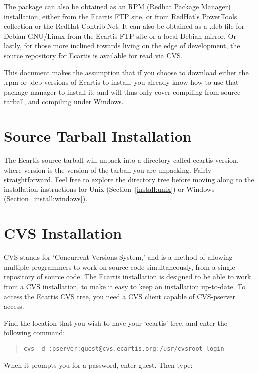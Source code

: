 \documentclass{book}
\begin{document}
The package can also be obtained as an RPM (Redhat Package Manager)
installation, either from the Ecartis FTP site, or from RedHat's PowerTools
collection or the RedHat Contrib|Net.  It can also be obtained as a .deb file
for Debian GNU/Linux from the Ecartis FTP site or a local Debian mirror.  Or
lastly, for those more inclined towards living on the edge of development, the
source repository for Ecartis is available for read via CVS.
   
This document makes the assumption that if you choose to download either the
.rpm or .deb versions of Ecartis to install, you already know how to use that
package manager to install it, and will thus only cover compiling from source
tarball, and compiling under Windows.

\section{Source Tarball Installation}
\label{install:tarball}

The Ecartis source tarball will unpack into a directory called ecartis-version,
where version is the version of the tarball you are unpacking.  Fairly
straightforward.  Feel free to explore the directory tree before moving along
to the installation instructions for Unix (Section~\ref{install:unix}) or
Windows (Section~\ref{install:windows}).

\section{CVS Installation}
\label{install:CVS}

CVS stands for `Concurrent Versions System,' and is a method of allowing
multiple programmers to work on source code simultaneously, from a single
repository of source code. The Ecartis installation is designed to be able to
work from a CVS installation, to make it easy to keep an installation
up-to-date.  To access the Ecartis CVS tree, you need a CVS client capable of
CVS-pserver access.
   
Find the location that you wish to have your `ecartis' tree, and enter the
following command:

\begin{quote}
\footnotesize
\begin{verbatim}
cvs -d :pserver:guest@cvs.ecartis.org:/usr/cvsroot login
\end{verbatim}
\end{quote}

When it prompts you for a password, enter guest.  Then type:
   
\end{document}
